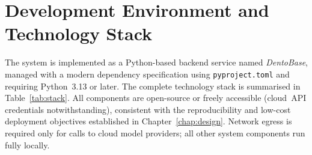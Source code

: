 \documentclass[12pt,a4paper]{report}
\begin{document}
\section{Development Environment and Technology Stack}
\label{sec:stack}

The system is implemented as a Python-based backend service named
\textit{DentoBase}, managed with a modern dependency specification using
\texttt{pyproject.toml} and requiring Python~3.13 or later.  The
complete technology stack is summarised in Table~\ref{tab:stack}.  All
components are open-source or freely accessible (cloud~API credentials
notwithstanding), consistent with the reproducibility and low-cost
deployment objectives established in Chapter~\ref{chap:design}.  Network egress is
required only for calls to cloud model providers; all other system
components run fully locally.
\end{document}
